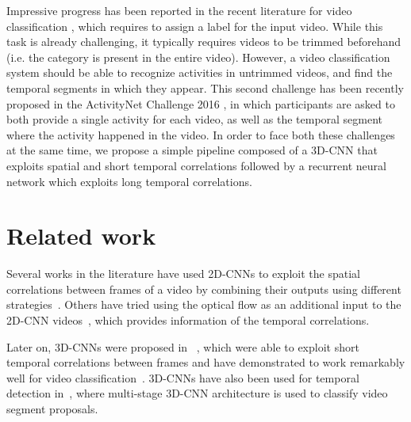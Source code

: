\documentclass{article}
\begin{document}
Impressive progress has been reported in the recent literature for video classification \cite{}, which requires to assign a label for the input video. While this task is already challenging, it typically requires videos to be trimmed beforehand (i.e. the category is present in the entire video). However, a video classification system should be able to recognize activities in untrimmed videos, and find the temporal segments in which they appear. This second challenge has been recently proposed in the ActivityNet Challenge 2016 \cite{}, in which participants are asked to both provide a single activity for each video, as well as the temporal segment where the activity happened in the video. %
In order to face both these challenges at the same time, we propose a simple pipeline composed of a 3D-CNN that exploits spatial and short temporal correlations followed by a recurrent neural network which exploits long temporal correlations.


\section{Related work}


Several works in the literature have used 2D-CNNs to exploit the spatial correlations between frames of a video by combining their outputs using different strategies~\cite{gkioxari2015contextual,yeung2015end,ballas2015delving}. Others have tried using the optical flow as an additional input to the 2D-CNN videos~\cite{wang2015towards}, which provides information of the temporal correlations. %

Later on, 3D-CNNs were proposed in ~\cite{tran2014learning}, which were able to exploit short temporal correlations between frames and have demonstrated to work remarkably well for video classification~\cite{tran2014learning,tran2015deep}. 3D-CNNs have also been used for temporal detection in~\cite{shoutemporal}, where multi-stage 3D-CNN architecture is used to classify video segment proposals.
\end{document}
